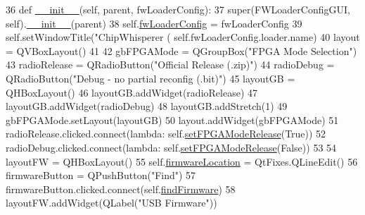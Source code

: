 \begin{DoxyCode}
36     \textcolor{keyword}{def }\hyperlink{classsoftware_1_1chipwhisperer_1_1capture_1_1scopes_1_1cwhardware_1_1ChipWhispererFWLoaderGUI_1_1FWLoaderConfigGUI_a34c2ad3fc05a38243c047aee6386e9a6}{\_\_init\_\_}(self, parent, fwLoaderConfig):
37         super(FWLoaderConfigGUI, self).\hyperlink{classsoftware_1_1chipwhisperer_1_1capture_1_1scopes_1_1cwhardware_1_1ChipWhispererFWLoaderGUI_1_1FWLoaderConfigGUI_a34c2ad3fc05a38243c047aee6386e9a6}{\_\_init\_\_}(parent)
38         self.\hyperlink{classsoftware_1_1chipwhisperer_1_1capture_1_1scopes_1_1cwhardware_1_1ChipWhispererFWLoaderGUI_1_1FWLoaderConfigGUI_a71542d72bad0a74f3a79ef7c806c0dfb}{fwLoaderConfig} = fwLoaderConfig
39         self.setWindowTitle(\textcolor{stringliteral}{"ChipWhisperer (%
      self.fwLoaderConfig.loader.name)
40         layout = QVBoxLayout()
41 
42         gbFPGAMode = QGroupBox(\textcolor{stringliteral}{"FPGA Mode Selection"})
43         radioRelease = QRadioButton(\textcolor{stringliteral}{"Official Release (.zip)"})
44         radioDebug = QRadioButton(\textcolor{stringliteral}{"Debug - no partial reconfig (.bit)"})
45         layoutGB = QHBoxLayout()
46         layoutGB.addWidget(radioRelease)
47         layoutGB.addWidget(radioDebug)
48         layoutGB.addStretch(1)
49         gbFPGAMode.setLayout(layoutGB)
50         layout.addWidget(gbFPGAMode)
51         radioRelease.clicked.connect(\textcolor{keyword}{lambda}: self.\hyperlink{classsoftware_1_1chipwhisperer_1_1capture_1_1scopes_1_1cwhardware_1_1ChipWhispererFWLoaderGUI_1_1FWLoaderConfigGUI_a772e10722e11db9c3a70d17a6c500933}{setFPGAModeRelease}(\textcolor{keyword}{True}))
52         radioDebug.clicked.connect(\textcolor{keyword}{lambda}: self.\hyperlink{classsoftware_1_1chipwhisperer_1_1capture_1_1scopes_1_1cwhardware_1_1ChipWhispererFWLoaderGUI_1_1FWLoaderConfigGUI_a772e10722e11db9c3a70d17a6c500933}{setFPGAModeRelease}(\textcolor{keyword}{False}))
53 
54         layoutFW = QHBoxLayout()
55         self.\hyperlink{classsoftware_1_1chipwhisperer_1_1capture_1_1scopes_1_1cwhardware_1_1ChipWhispererFWLoaderGUI_1_1FWLoaderConfigGUI_a751c52e2e0d4ef2f27dcfd151b109dce}{firmwareLocation} = QtFixes.QLineEdit()
56         firmwareButton = QPushButton(\textcolor{stringliteral}{"Find"})
57         firmwareButton.clicked.connect(self.\hyperlink{classsoftware_1_1chipwhisperer_1_1capture_1_1scopes_1_1cwhardware_1_1ChipWhispererFWLoaderGUI_1_1FWLoaderConfigGUI_ad274bc7a30397d859f006656758fb1da}{findFirmware})
58         layoutFW.addWidget(QLabel(\textcolor{stringliteral}{"USB Firmware"}))
}
\end{DoxyCode}

